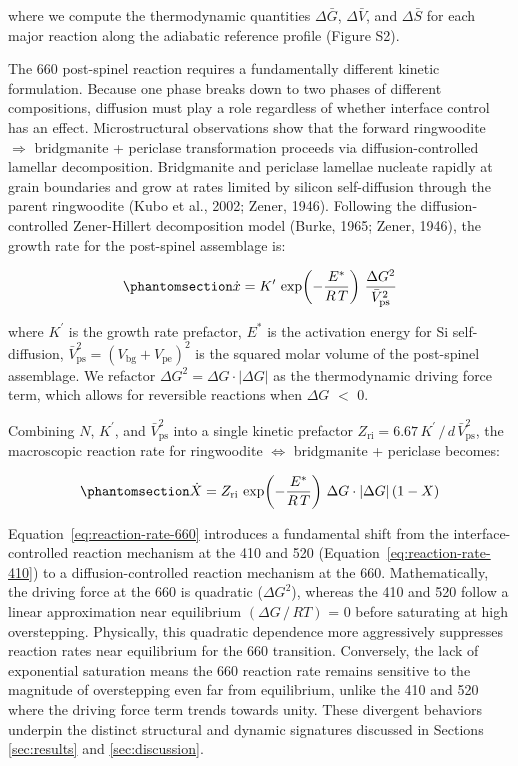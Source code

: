 \documentclass[draft,linenumbers]{agujournal2019}
\begin{document}
where we compute the thermodynamic quantities \(\Delta \bar{G}\),
\(\Delta \bar{V}\), and \(\Delta \bar{S}\) for each major reaction along
the adiabatic reference profile (Figure S2).

The 660 post-spinel reaction requires a fundamentally different kinetic
formulation. Because one phase breaks down to two phases of different
compositions, diffusion must play a role regardless of whether interface
control has an effect. Microstructural observations show that the
forward ringwoodite \(\Rightarrow\) bridgmanite + periclase
transformation proceeds via diffusion-controlled lamellar decomposition.
Bridgmanite and periclase lamellae nucleate rapidly at grain boundaries
and grow at rates limited by silicon self-diffusion through the parent
ringwoodite (Kubo et al., 2002; Zener, 1946). Following the
diffusion-controlled Zener-Hillert decomposition model (Burke, 1965;
Zener, 1946), the growth rate for the post-spinel assemblage is:

\begin{equation}\protect\phantomsection\label{eq:growth-rate-660}{
  \dot{x} = K^{\prime}\, \exp\!\left(-\frac{E^{\ast}}{R\, T}\right)\, \frac{\Delta G^2}{\bar{V}_\mathrm{ps}^2}
}\end{equation}

where \(K^{\prime}\) is the growth rate prefactor, \(E^{\ast}\) is the
activation energy for Si self-diffusion,
\(\bar{V}_\mathrm{ps}^2 = (V_\mathrm{bg} + V_\mathrm{pe})^2\) is the
squared molar volume of the post-spinel assemblage. We refactor
\(\Delta G^2 = \Delta G \cdot |\Delta G|\) as the thermodynamic driving
force term, which allows for reversible reactions when \(\Delta G\)
\(<\) 0.

Combining \(N\), \(K^{\prime}\), and \(\bar{V}_\mathrm{ps}^2\) into a
single kinetic prefactor
\(Z_\mathrm{ri} = \text{6.67}\, K^{\prime}\, /\, d\, \bar{V}_\mathrm{ps}^2\),
the macroscopic reaction rate for ringwoodite \(\Leftrightarrow\)
bridgmanite + periclase becomes:

\begin{equation}\protect\phantomsection\label{eq:reaction-rate-660}{
  \dot{X} = Z_\mathrm{ri}\, \exp\!\left(-\frac{E^{\ast}}{R\, T}\right)\, \Delta G \cdot |\Delta G| \left(1 - X \right)
}\end{equation}

Equation~\ref{eq:reaction-rate-660} introduces a fundamental shift from
the interface-controlled reaction mechanism at the 410 and 520
(Equation~\ref{eq:reaction-rate-410}) to a diffusion-controlled reaction
mechanism at the 660. Mathematically, the driving force at the 660 is
quadratic (\(\Delta G^2\)), whereas the 410 and 520 follow a linear
approximation near equilibrium \((\Delta G\, /\, RT)\) = 0 before
saturating at high overstepping. Physically, this quadratic dependence
more aggressively suppresses reaction rates near equilibrium for the 660
transition. Conversely, the lack of exponential saturation means the 660
reaction rate remains sensitive to the magnitude of overstepping even
far from equilibrium, unlike the 410 and 520 where the driving force
term trends towards unity. These divergent behaviors underpin the
distinct structural and dynamic signatures discussed in Sections
\ref{sec:results} and \ref{sec:discussion}.
\end{document}
